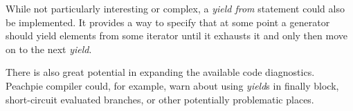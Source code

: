 While not particularly interesting or complex, a \emph{yield from} statement could also be implemented. It provides a way to specify that at some point a generator should yield elements from some iterator until it exhausts it and only then move on to the next \emph{yield}.

There is also great potential in expanding the available code diagnostics. Peachpie compiler could, for example, warn about using \emph{yield}s in finally block, short-circuit evaluated branches, or other potentially problematic places.


